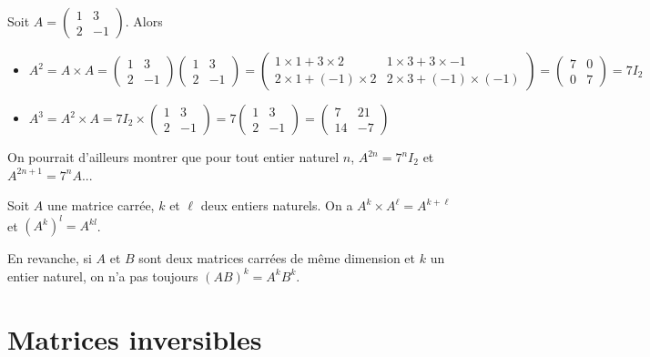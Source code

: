 \documentclass[11pt,fleqn]{book} %
\begin{document}
\begin{example} Soit $A=\begin{pmatrix}
1 & 3 \\ 2 & -1
\end{pmatrix}$. Alors
\begin{itemize}
\item $A^2 = A \times A = \begin{pmatrix}
1 & 3 \\ 2 & -1
\end{pmatrix} \begin{pmatrix}
1 & 3 \\ 2 & -1
\end{pmatrix} = \begin{pmatrix}1 \times 1 + 3 \times 2 & 1 \times 3 + 3 \times -1 \\ 2 \times 1 + (-1) \times 2 & 2 \times 3 + (-1) \times (-1) \end{pmatrix} = \begin{pmatrix}7 & 0 \\ 0 & 7 \end{pmatrix} =7I_2$
\item $A^3 = A^2 \times A = 7I_2 \times \begin{pmatrix}
1 & 3 \\ 2 & -1
\end{pmatrix} = 7 \begin{pmatrix}
1 & 3 \\ 2 & -1
\end{pmatrix} = \begin{pmatrix}
7 & 21 \\ 14 & -7
\end{pmatrix}$
\end{itemize}
On pourrait d'ailleurs montrer que pour tout entier naturel $n$, $A^{2n} = 7^n I_2$ et $A^{2n+1}=7^n A$...
\end{example}

\begin{proposition}Soit $A$ une matrice carrée, $k$ et $\ell$ deux entiers naturels. On a $A^{k} \times A^{\ell} =A ^{k+\ell}$ et $(A^k)^l=A^{kl}$.\end{proposition}

En revanche, si $A$ et $B$ sont deux matrices carrées de même dimension et $k$ un entier naturel, on n'a pas toujours $(AB)^k = A^kB^k$.

\section{Matrices inversibles}
\end{document}
